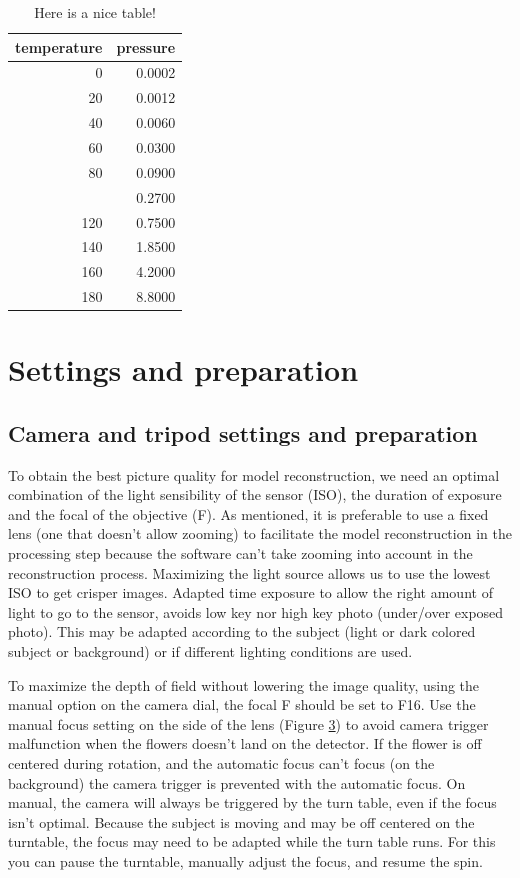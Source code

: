 \documentclass[
]{book}
\theoremstyle{definition}
\theoremstyle{definition}
\theoremstyle{definition}
\theoremstyle{definition}
\theoremstyle{remark}
\begin{document}
\begin{table}

\caption{\label{tab:nice-tab}Here is a nice table!}
\centering
\begin{tabular}[t]{rr}
\toprule
temperature & pressure\\
\midrule
0 & 0.0002\\
20 & 0.0012\\
40 & 0.0060\\
60 & 0.0300\\
80 & 0.0900\\
\addlinespace
100 & 0.2700\\
120 & 0.7500\\
140 & 1.8500\\
160 & 4.2000\\
180 & 8.8000\\
\bottomrule
\end{tabular}
\end{table}

\hypertarget{settings-and-preparation}{%
\chapter{Settings and preparation}\label{settings-and-preparation}}

\hypertarget{camera-and-tripod-settings-and-preparation}{%
\section{Camera and tripod settings and preparation}\label{camera-and-tripod-settings-and-preparation}}

To obtain the best picture quality for model reconstruction, we need an
optimal combination of the light sensibility of the sensor (ISO), the
duration of exposure and the focal of the objective (F). As mentioned,
it is preferable to use a fixed lens (one that doesn't allow zooming) to
facilitate the model reconstruction in the processing step because the
software can't take zooming into account in the reconstruction process.
Maximizing the light source allows us to use the lowest ISO to get
crisper images. Adapted time exposure to allow the right amount of light
to go to the sensor, avoids low key nor high key photo (under/over
exposed photo). This may be adapted according to the subject (light or
dark colored subject or background) or if different lighting conditions
are used.

To maximize the depth of field without lowering the image quality, using
the manual option on the camera dial, the focal F should be set to F16.
Use the manual focus setting on the side of the lens (Figure
\protect\hyperlink{camera_arrows}{3}) to
avoid camera trigger malfunction when the flowers doesn't land on the
detector. If the flower is off centered during rotation, and the
automatic focus can't focus (on the background) the camera trigger is
prevented with the automatic focus. On manual, the camera will always be
triggered by the turn table, even if the focus isn't optimal. Because
the subject is moving and may be off centered on the turntable, the
focus may need to be adapted while the turn table runs. For this you can
pause the turntable, manually adjust the focus, and resume the spin.
\end{document}
